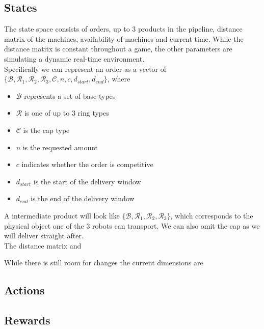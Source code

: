 \documentclass[runningheads,envcountsect]{llncs}
\begin{document}
\subsection{States} \label{states}
The state space consists of orders, up to 3 products in the pipeline, distance matrix of the machines, availability of machines and current time. While the distance matrix is constant throughout a game, the other parameters are simulating a dynamic real-time environment.\\
Specifically we can represent an order as a vector of $\{\mathcal{B}, \mathcal{R}_1, \mathcal{R}_2, \mathcal{R}_3, \mathcal{C}, n, c, d_{start}, d_{end}  \}$, where
\begin{itemize}
  \item $\mathcal{B}$ represents a set of base types
  \item $\mathcal{R}$ is one of up to 3 ring types
  \item $\mathcal{C}$ is the cap type
  \item $n$ is the requested amount
  \item $c$ indicates whether the order is competitive
  \item $d_{start}$ is the start of the delivery window
  \item $d_{end}$ is the end of the delivery window
\end{itemize}
A intermediate product will look like $\{\mathcal{B}, \mathcal{R}_1, \mathcal{R}_2, \mathcal{R}_3\}$, which corresponds to the physical object one of the 3 robots can transport. We can also omit the cap as we will deliver straight after.\\
The distance matrix and 

While there is still room for changes the current dimensions are 


\subsection{Actions}

\subsection{Rewards}


\vspace{24pt}



\end{document}

